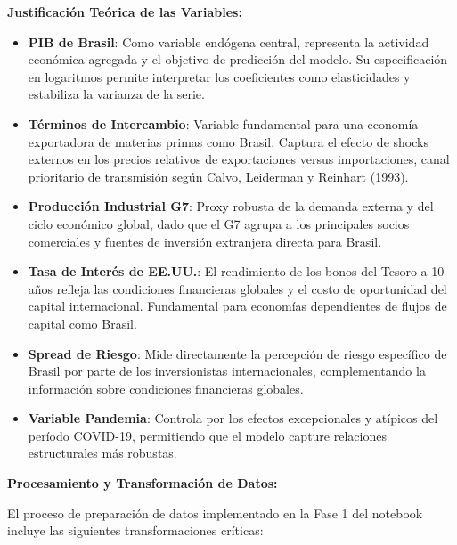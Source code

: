 \documentclass[3p,11pt]{elsarticle}
\begin{document}
\textbf{Justificación Teórica de las Variables:}

\begin{itemize}
    \item \textbf{PIB de Brasil}: Como variable endógena central, representa la actividad económica agregada y el objetivo de predicción del modelo. Su especificación en logaritmos permite interpretar los coeficientes como elasticidades y estabiliza la varianza de la serie.
    
    \item \textbf{Términos de Intercambio}: Variable fundamental para una economía exportadora de materias primas como Brasil. Captura el efecto de shocks externos en los precios relativos de exportaciones versus importaciones, canal prioritario de transmisión según Calvo, Leiderman y Reinhart (1993).
    
    \item \textbf{Producción Industrial G7}: Proxy robusta de la demanda externa y del ciclo económico global, dado que el G7 agrupa a los principales socios comerciales y fuentes de inversión extranjera directa para Brasil.
    
    \item \textbf{Tasa de Interés de EE.UU.}: El rendimiento de los bonos del Tesoro a 10 años refleja las condiciones financieras globales y el costo de oportunidad del capital internacional. Fundamental para economías dependientes de flujos de capital como Brasil.
    
    \item \textbf{Spread de Riesgo}: Mide directamente la percepción de riesgo específico de Brasil por parte de los inversionistas internacionales, complementando la información sobre condiciones financieras globales.
    
    \item \textbf{Variable Pandemia}: Controla por los efectos excepcionales y atípicos del período COVID-19, permitiendo que el modelo capture relaciones estructurales más robustas.
\end{itemize}

\textbf{Procesamiento y Transformación de Datos:}

El proceso de preparación de datos implementado en la Fase 1 del notebook incluye las siguientes transformaciones críticas:
\end{document}
